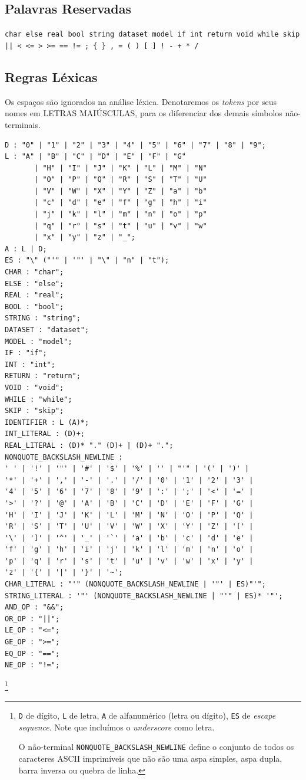 \documentclass[12pt]{article}
\newcommand{\red}{\textcolor{red}}
\newcommand\todo[1]{\red{\Large \text{TODO: #1}}}
\begin{document}
\subsection{Palavras Reservadas}
{\tt char else real bool string dataset model if int return void while skip \\ || < <= > >= == != ; \{ \} , = ( ) [ ] ! - + * /}
\subsection{Regras Léxicas}
Os espaços são ignorados na análise léxica.
Denotaremos os {\it tokens} por seus nomes em LETRAS MAIÚSCULAS, para os diferenciar dos demais símbolos não-terminais.

\todo{Ajeitar as aspas simples}

\begin{verbatim}
D : "0" | "1" | "2" | "3" | "4" | "5" | "6" | "7" | "8" | "9";
L : "A" | "B" | "C" | "D" | "E" | "F" | "G"
       | "H" | "I" | "J" | "K" | "L" | "M" | "N"
       | "O" | "P" | "Q" | "R" | "S" | "T" | "U"
       | "V" | "W" | "X" | "Y" | "Z" | "a" | "b"
       | "c" | "d" | "e" | "f" | "g" | "h" | "i"
       | "j" | "k" | "l" | "m" | "n" | "o" | "p"
       | "q" | "r" | "s" | "t" | "u" | "v" | "w"
       | "x" | "y" | "z" | "_";
A : L | D;
ES : "\" ("'" | '"' | "\" | "n" | "t");
CHAR : "char";
ELSE : "else";
REAL : "real";
BOOL : "bool";
STRING : "string";
DATASET : "dataset";
MODEL : "model";
IF : "if";
INT : "int";
RETURN : "return";
VOID : "void";
WHILE : "while";
SKIP : "skip";
IDENTIFIER : L (A)*;
INT_LITERAL : (D)+;
REAL_LITERAL : (D)* "." (D)+ | (D)+ ".";
NONQUOTE_BACKSLASH_NEWLINE :
' ' | '!' | '"' | '#' | '$' | '%' | '' | "'" | '(' | ')' | 
'*' | '+' | ',' | '-' | '.' | '/' | '0' | '1' | '2' | '3' | 
'4' | '5' | '6' | '7' | '8' | '9' | ':' | ';' | '<' | '=' | 
'>' | '?' | '@' | 'A' | 'B' | 'C' | 'D' | 'E' | 'F' | 'G' | 
'H' | 'I' | 'J' | 'K' | 'L' | 'M' | 'N' | 'O' | 'P' | 'Q' | 
'R' | 'S' | 'T' | 'U' | 'V' | 'W' | 'X' | 'Y' | 'Z' | '[' | 
'\' | ']' | '^' | '_' | '`' | 'a' | 'b' | 'c' | 'd' | 'e' | 
'f' | 'g' | 'h' | 'i' | 'j' | 'k' | 'l' | 'm' | 'n' | 'o' | 
'p' | 'q' | 'r' | 's' | 't' | 'u' | 'v' | 'w' | 'x' | 'y' | 
'z' | '{' | '|' | '}' | '~';
CHAR_LITERAL : "'" (NONQUOTE_BACKSLASH_NEWLINE | '"' | ES)"'";
STRING_LITERAL : '"' (NONQUOTE_BACKSLASH_NEWLINE | "'" | ES)* '"';
AND_OP : "&&";
OR_OP : "||";
LE_OP : "<=";
GE_OP : ">=";
EQ_OP : "==";
NE_OP : "!=";
\end{verbatim}
\footnote{\texttt{D} de dígito, \texttt{L} de letra, \texttt{A} de alfanumérico (letra ou dígito), \texttt{ES} de {\it escape sequence}.  Note que incluímos o {\it underscore} como letra.

O não-terminal \texttt{NONQUOTE\_BACKSLASH\_NEWLINE} define o conjunto de todos os caracteres ASCII imprimíveis que não são uma aspa simples, aspa dupla, barra inversa ou quebra de linha.}
\end{document}

